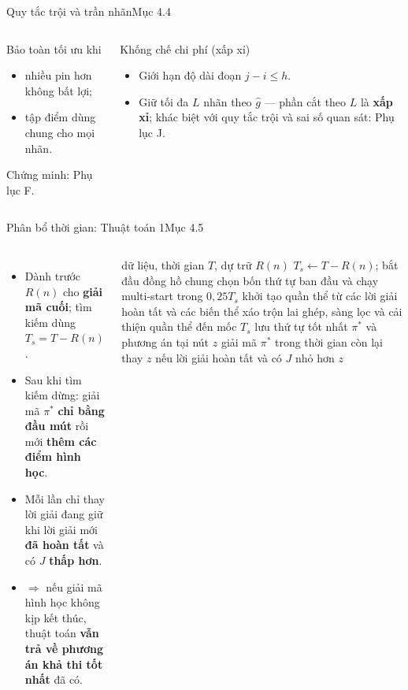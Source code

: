 \documentclass[aspectratio=169,10pt,t,xcolor={table}]{beamer}
\newcommand{\src}[1]{\hfill{\normalfont\footnotesize\color{white!62!navy}#1}}  %
\begin{document}
\begin{frame}{Quy tắc trội và trần nhãn\src{Mục 4.4}}
\begin{columns}[T,onlytextwidth]
\begin{block}{Bảo toàn tối ưu khi}
\begin{itemize}
\item nhiều pin hơn không bất lợi;
\item tập điểm dùng chung cho mọi nhãn.
\end{itemize}
Chứng minh: Phụ lục F.
\end{block}
\begin{alertblock}{Khống chế chi phí (xấp xỉ)}
\scriptsize
\begin{itemize}
\item Giới hạn độ dài đoạn $j-i\le h$.
\item Giữ tối đa $L$ nhãn theo $\widehat g$ --- phần cắt theo $L$ là \textbf{xấp xỉ}; khác biệt với quy tắc trội và sai số quan sát: Phụ lục J.
\end{itemize}
\end{alertblock}
\end{columns}
\end{frame}

\begin{frame}{Phân bổ thời gian: Thuật toán 1\src{Mục 4.5}}
\begin{columns}[T,onlytextwidth]
\begin{itemize}\footnotesize
\item Dành trước $R(n)$ cho \textbf{giải mã cuối}; tìm kiếm dùng $T_s=T-R(n)$.
\item Sau khi tìm kiếm dừng: giải mã $\pi^*$ \textbf{chỉ bằng đầu mút} rồi mới \textbf{thêm các điểm hình học}.
\item Mỗi lần chỉ thay lời giải đang giữ khi lời giải mới \textbf{đã hoàn tất} và có $J$ \textbf{thấp hơn}.
\item $\Rightarrow$ nếu giải mã hình học không kịp kết thúc, thuật toán \textbf{vẫn trả về phương án khả thi tốt nhất} đã có.
\end{itemize}
\setcounter{algorithm}{0}
\begin{algorithm}[H]
\caption{GEMS: tìm kiếm memetic kết hợp giải mã hình học}
\footnotesize
\begin{algorithmic}[1]
\Require dữ liệu, thời gian $T$, dự trữ $R(n)$
\State $T_s\gets T-R(n)$; bắt đầu đồng hồ chung
\State chọn bốn thứ tự ban đầu và chạy multi-start trong $0{,}25T_s$
\State khởi tạo quần thể từ các lời giải hoàn tất và các biến thể xáo trộn
\State lai ghép, sàng lọc và cải thiện quần thể đến mốc $T_s$
\State lưu thứ tự tốt nhất $\pi^*$ và phương án tại nút $z$
\State giải mã $\pi^*$ trong thời gian còn lại
\State thay $z$ nếu lời giải hoàn tất và có $J$ nhỏ hơn
\EndFor
\State \Return $z$
\end{algorithmic}
\end{algorithm}
\end{columns}
\end{frame}
\end{document}
